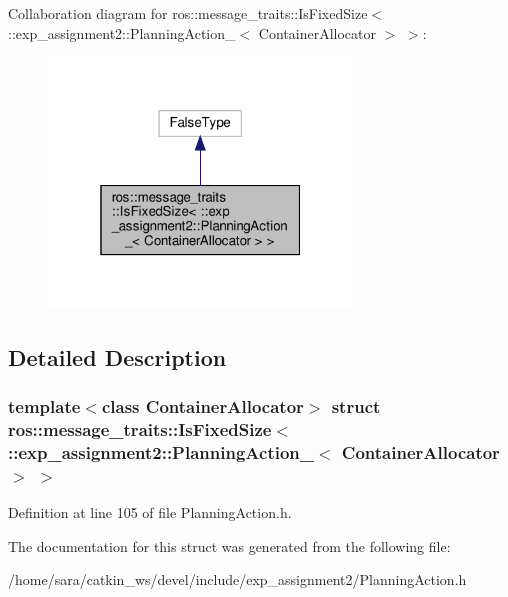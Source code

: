 Collaboration diagram for ros\+:\+:message\+\_\+traits\+:\+:Is\+Fixed\+Size$<$ \+:\+:exp\+\_\+assignment2\+:\+:Planning\+Action\+\_\+$<$ Container\+Allocator $>$ $>$\+:
\nopagebreak
\begin{figure}[H]
\begin{center}
\leavevmode
\includegraphics[width=229pt]{structros_1_1message__traits_1_1IsFixedSize_3_01_1_1exp__assignment2_1_1PlanningAction___3_01Con8a16e7aac322deeb88e14049cc1c8a1a}
\end{center}
\end{figure}


\subsection{Detailed Description}
\subsubsection*{template$<$class Container\+Allocator$>$\newline
struct ros\+::message\+\_\+traits\+::\+Is\+Fixed\+Size$<$ \+::exp\+\_\+assignment2\+::\+Planning\+Action\+\_\+$<$ Container\+Allocator $>$ $>$}



Definition at line 105 of file Planning\+Action.\+h.



The documentation for this struct was generated from the following file\+:\begin{DoxyCompactItemize}
\item 
/home/sara/catkin\+\_\+ws/devel/include/exp\+\_\+assignment2/Planning\+Action.\+h\end{DoxyCompactItemize}
